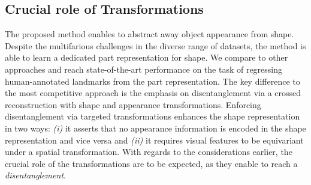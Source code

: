 	\subsection{Crucial role of Transformations}

	The proposed method enables to abstract away object appearance from shape.
	Despite the multifarious challenges in the diverse range of datasets, the method is able to learn a dedicated part representation for shape.
	We compare to other approaches and reach state-of-the-art performance on the task of regressing human-annotated landmarks from the part representation.
	The key difference to the most competitive approach \cite{zhang18} is the emphasis on disentanglement via a crossed reconstruction with shape and appearance transformations.
	Enforcing disentanglement via targeted transformations enhances the shape representation in two ways: \emph{(i)} it asserts that no appearance information is encoded in the shape representation and vice versa and \emph{(ii)} it requires visual features to be equivariant under a spatial transformation.
	With regards to the considerations earlier, the crucial role of the transformations are to be expected, as they enable to reach a \textit{disentanglement}.


